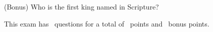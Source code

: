 \documentclass[11pt,addpoints]{exam}   	%
\begin{document}
\begin{questions}
\vspace{.2in}

\bonusquestion[1] (Bonus) Who is the first king named in Scripture?
\end{questions}

\vspace{2in}

\begin{center}
This exam has \numquestions\ questions for a total of \numpoints\ points and \numbonuspoints\ bonus points.
\end{center}

\begin{center}
\gradetable[v][questions]
\end{center}
\end{document}

